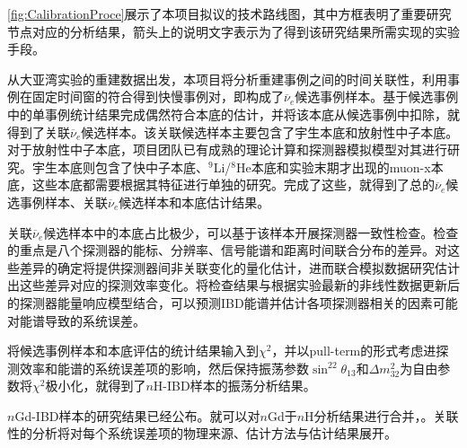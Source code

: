\documentclass[a4paper,zihao=-4]{article}
\begin{document}
\cref{fig:CalibrationProce}展示了本项目拟议的技术路线图，其中方框表明了重要研究节点对应的分析结果，箭头上的说明文字表示为了得到该研究结果所需实现的实验手段。

从大亚湾实验的重建数据出发，本项目将分析重建事例之间的时间关联性，利用事例在固定时间窗的符合得到快慢事例对，即构成了$\overline{\nu}_e$候选事例样本。基于候选事例中的单事例统计结果完成偶然符合本底的估计，并将该本底从候选事例中扣除，就得到了关联$\overline{\nu}_e$候选样本。该关联候选样本主要包含了宇生本底和放射性中子本底。对于放射性中子本底，项目团队已有成熟的理论计算和探测器模拟模型对其进行研究。宇生本底则包含了快中子本底、$^9$Li/$^8$He本底和实验末期才出现的muon-x本底，这些本底都需要根据其特征进行单独的研究。完成了这些，就得到了总的$\overline{\nu}_e$候选事例样本、关联$\overline{\nu}_e$候选样本和本底估计结果。

关联$\overline{\nu}_e$候选样本中的本底占比极少，可以基于该样本开展探测器一致性检查。检查的重点是八个探测器的能标、分辨率、信号能谱和距离时间联合分布的差异。对这些差异的确定将提供探测器间非关联变化的量化估计，进而联合模拟数据研究估计出这些差异对应的探测效率变化。将检查结果与根据实验最新的非线性数据更新后的探测器能量响应模型结合，可以预测IBD能谱并估计各项探测器相关的因素可能对能谱导致的系统误差。

将候选事例样本和本底评估的统计结果输入到$\chi^2$，并以pull-term的形式考虑进探测效率和能谱的系统误差项的影响，然后保持振荡参数$\sin^22\theta_{13}$和$\Delta m_{32}^2$为自由参数将$\chi^2$极小化，就得到了$n$H-IBD样本的振荡分析结果。

$n$Gd-IBD样本的研究结果已经公布。就可以对$n$Gd于$n$H分析结果进行合并，。关联性的分析将对每个系统误差项的物理来源、估计方法与估计结果展开。
\end{document}
